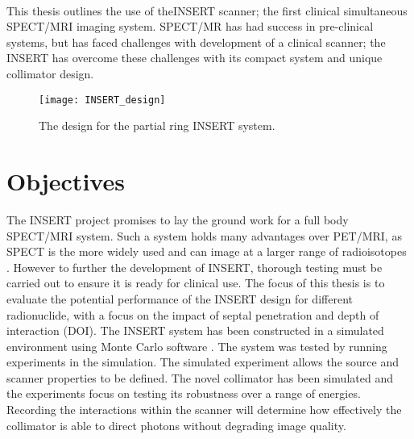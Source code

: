 \paragraph{}
This thesis outlines the use of the\acrshort{INSERT} scanner; the first clinical simultaneous \acrshort{SPECT/MRI} imaging system. \acrshort{SPECT/MR} has had success in pre-clinical systems, but has faced challenges with development of a clinical scanner; the \acrshort{INSERT} has overcome these challenges with its compact system and unique collimator design. 

\begin{figure}[htp]
    \centering
    \texttt{[image: INSERT\_design]} %
    \caption{The design for the partial ring INSERT system.} \label{fig:INSERT}
\end{figure}

\section{Objectives}
The INSERT project promises to lay the ground work for a full body SPECT/MRI system. Such a system holds many advantages over PET/MRI, as SPECT is the more widely used and can image at a larger range of radioisotopes \cite{doi:10.1177/153303460600500406}. However to further the development of INSERT, thorough testing must be carried out to ensure it is ready for clinical use. The focus of this thesis is to evaluate the potential performance of the INSERT design for different radionuclide, with a focus on the impact of septal penetration and depth of interaction (DOI). The INSERT system has been constructed in a simulated environment using Monte Carlo software \cite{1236960}. The system was tested by running experiments in the simulation. The simulated experiment allows the source and scanner properties to be defined. The novel collimator has been simulated and the experiments focus on testing its robustness over a range of energies. Recording the interactions within the scanner will determine how effectively the collimator is able to direct photons without degrading image quality.
